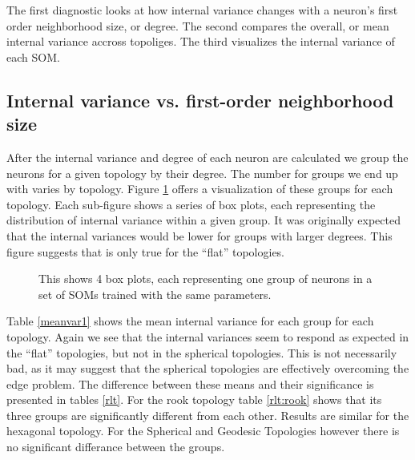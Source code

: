 The first diagnostic looks at how internal variance changes with a neuron's first
order neighborhood size, or degree.  The second compares the overall, or mean
internal variance accross topoliges.  The third visualizes the internal
variance of each SOM.

\subsection{Internal variance vs. first-order neighborhood size}
After the internal variance and degree of each neuron are calculated we
group the neurons for a given topology by their degree. The number for groups
we end up with varies by topology. Figure \ref{boxplot} offers a visualization
of these groups for each topology.  Each sub-figure shows a series of box
plots, each representing the distribution of internal variance within a given
group.  It was originally expected that the internal variances would be lower
for groups with larger degrees. This figure suggests that is only true for the
``flat'' topologies.

\begin{figure}[hbt]
\label{boxplot}
\centering
{}
\caption{This shows 4 box plots, each representing one group of neurons in a set
of SOMs trained with the same parameters.}
\end{figure}

Table \ref{meanvar1} shows the mean internal variance for each group for each
topology. Again we see that the internal variances seem to respond as expected
in the ``flat'' topologies, but not in the spherical topologies.  This is not
necessarily bad, as it may suggest that the spherical topologies are
effectively overcoming the edge problem.  The difference between these means
and their significance is presented in tables \ref{rlt}.  For the rook
topology table \ref{rlt:rook} shows that its three groups are significantly
different from each other. Results are similar for the hexagonal topology. For
the Spherical and Geodesic Topologies however there is no significant
differance between the groups.

